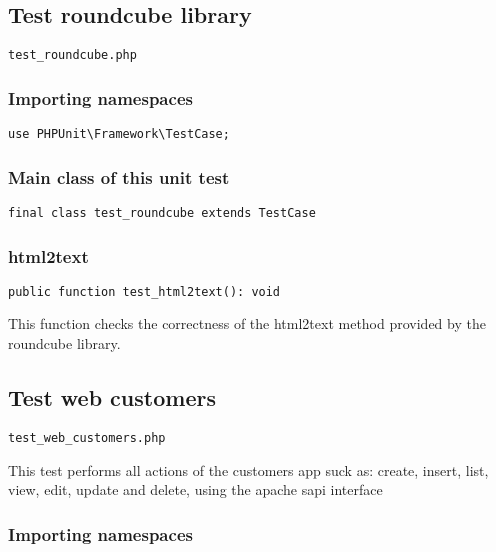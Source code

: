\documentclass[a4paper]{article}
\begin{document}
\hypertarget{toc51}{}
\subsection{Test roundcube library}

\begin{lstlisting}
test_roundcube.php
\end{lstlisting}

\hypertarget{toc52}{}
\subsubsection{Importing namespaces}

\begin{lstlisting}
use PHPUnit\Framework\TestCase;
\end{lstlisting}

\hypertarget{toc53}{}
\subsubsection{Main class of this unit test}

\begin{lstlisting}
final class test_roundcube extends TestCase
\end{lstlisting}

\hypertarget{toc54}{}
\subsubsection{html2text}

\begin{lstlisting}
public function test_html2text(): void
\end{lstlisting}

This function checks the correctness of the html2text method provided by the
roundcube library.

\hypertarget{toc55}{}
\subsection{Test web customers}

\begin{lstlisting}
test_web_customers.php
\end{lstlisting}

This test performs all actions of the customers app suck as: create, insert,
list, view, edit, update and delete, using the apache sapi interface

\hypertarget{toc56}{}
\subsubsection{Importing namespaces}
\end{document}
